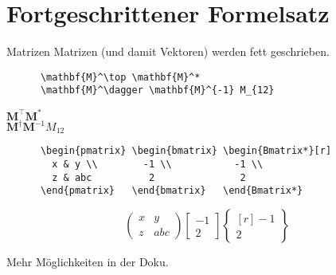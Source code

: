 \section{Fortgeschrittener Formelsatz}

\begin{frame}[fragile]{
  Matrizen
  \hfill{}
}
  Matrizen (und damit Vektoren) werden fett geschrieben.
  \begin{CodeExample}{0.70}
    \begin{lstlisting}
      \mathbf{M}^\top \mathbf{M}^*
      \mathbf{M}^\dagger \mathbf{M}^{-1} M_{12}
    \end{lstlisting}
  \CodeResult
    $\mathbf{M}^\top \mathbf{M}^*$ \\
    $\mathbf{M}^\dagger \mathbf{M}^{-1} M_{12}$
  \end{CodeExample}

  \fontsize{8}{6}
  \begin{CodeExample}{0.70}
    \begin{lstlisting}
      \begin{pmatrix} \begin{bmatrix} \begin{Bmatrix*}[r]
        x & y \\        -1 \\           -1 \\
        z & abc          2               2
      \end{pmatrix}   \end{bmatrix}   \end{Bmatrix*}
    \end{lstlisting}
  \CodeResult
    \begin{equation*}
      \begin{pmatrix}
        x & y \\
        z & abc
      \end{pmatrix}
      \begin{bmatrix}
        -1 \\
         2
      \end{bmatrix}
      \begin{Bmatrix*}[r]
        -1 \\
         2
      \end{Bmatrix*}
    \end{equation*}
  \end{CodeExample}

  \vspace{1em}
  Mehr Möglichkeiten in der Doku.
\end{frame}

